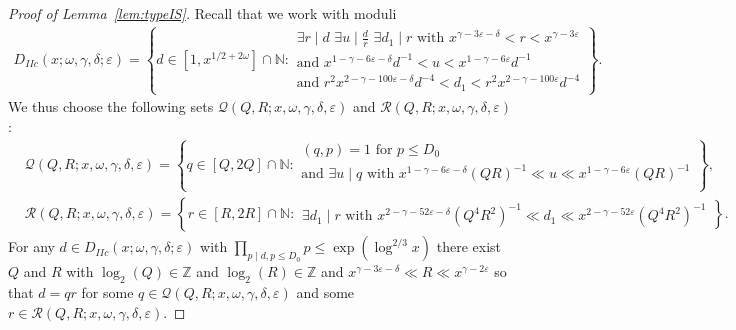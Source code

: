 \documentclass{amsart}
\numberwithin{equation}{section}
\begin{document}
\begin{proof}[Proof of Lemma~\ref{lem:typeIS}]
Recall that we work with moduli
\begin{align*}
D_{IIc}(x;\omega,\gamma,\delta;\varepsilon) = \left\{d \in  [1, x^{1/2+2\omega}]\cap \mathbb{N}:  \begin{array}{l} 
\exists r \mid d \,\, \exists u \mid \frac{d}{r} \,\, \exists d_1 \mid r \mbox{ with } x^{\gamma -3\varepsilon-\delta} < r < x^{\gamma - 3\varepsilon} \\ \mbox{and }    x^{1-\gamma-6\varepsilon-\delta}   d^{-1} < u < x^{1-\gamma-6\varepsilon}   d^{-1} \\ 
\mbox{and }  r^2 x^{2-\gamma-100\varepsilon -\delta}  d^{-4} < d_1 <  r^2 x^{2-\gamma-100\varepsilon}  d^{-4}
\end{array}\right\}.
\end{align*}
We thus choose the following sets $\mathcal{Q}(Q,R;x,\omega,\gamma,\delta,\varepsilon)$ and $\mathcal{R}(Q,R;x,\omega,\gamma,\delta,\varepsilon)$:
\begin{align*}
&\mathcal{Q}(Q,R;x,\omega,\gamma,\delta,\varepsilon)=\left\{q\in [Q,2Q] \cap \mathbb{N}: 
 \begin{array}{l}  (q,p)=1 \mbox{ for } p \leq D_0 \\ \mbox{and }
\exists u \mid q \mbox{ with }  x^{1-\gamma-6\varepsilon-\delta}   (QR)^{-1} \ll u \ll x^{1-\gamma-6\varepsilon}   (QR)^{-1}\\
\end{array}\right\},\\
&\mathcal{R}(Q,R;x,\omega,\gamma,\delta,\varepsilon)=\left\{r\in [R,2R] \cap \mathbb{N}: 
 \begin{array}{l}   
\exists d_1 \mid r \mbox{ with }   x^{2-\gamma-52\varepsilon -\delta}  (Q^4R^2)^{-1} \ll d_1 \ll    x^{2-\gamma-52\varepsilon}  (Q^4R^2)^{-1}
\end{array}\right\}.
\end{align*}
For any $d \in D_{IIc}(x;\omega,\gamma,\delta;\varepsilon)$ with 
$\prod_{p \mid d, p \leq D_0} p \leq \exp(\log^{2/3} x)$ there exist  $Q$ and $R$ with $\log_2(Q) \in \mathbb{Z}$ and $\log_2(R) \in \mathbb{Z}$    and $ x^{\gamma -3\varepsilon-\delta} \ll R \ll x^{\gamma - 2\varepsilon} $ so that $d=qr$ for some $q \in  \mathcal{Q}(Q,R;x,\omega,\gamma,\delta,\varepsilon)$ and some $r \in \mathcal{R}(Q,R;x,\omega,\gamma,\delta,\varepsilon)$.   
\medskip


\end{proof}
\end{document}
